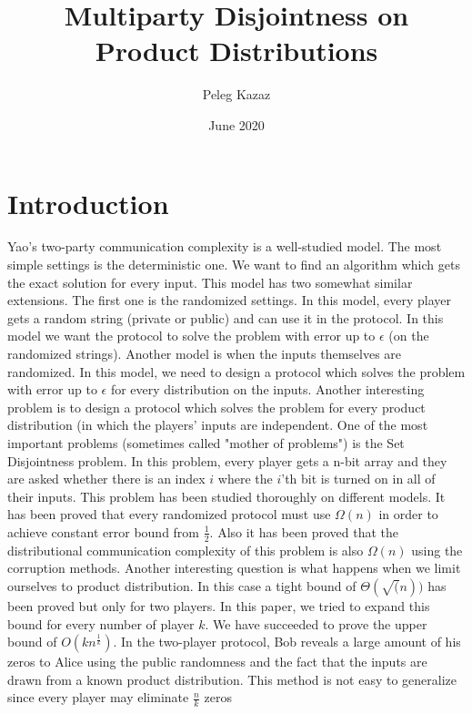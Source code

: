 \documentclass{article}
\title{Multiparty Disjointness on Product Distributions}
\author{Peleg Kazaz}
\date{June 2020}
\theoremstyle{plain}
\begin{document}
\maketitle


\section{Introduction}
Yao's two-party communication complexity is a well-studied model. The most simple settings is the deterministic one. We want to find an algorithm which gets the exact solution for every input. This model has two somewhat similar extensions. The first one is the randomized settings. In this model, every player gets a random string (private or public) and can use it in the protocol. In this model we want the protocol to solve the problem with error up to $\epsilon$ (on the randomized strings). \newline
Another model is when the inputs themselves are randomized. In this model, we need to design a protocol which solves the problem with error up to $\epsilon$ for every distribution on the inputs. Another interesting problem is to design a protocol which solves the problem for every product distribution (in which the players' inputs are independent. \newline
One of the most important problems (sometimes called "mother of problems") is the Set Disjointness problem. In this problem, every player gets a n-bit array and they are asked whether there is an index $i$ where the $i$'th bit is turned on in all of their inputs. \newline
This problem has been studied thoroughly on different models. It has been proved that every randomized protocol must use $\Omega(n)$ in order to achieve constant error bound from $\frac{1}{2}$.  Also it has been proved that the distributional communication complexity of this problem is also $\Omega(n)$ using the corruption methods. Another interesting question is what happens when we limit ourselves to product distribution. In this case a tight bound of $\Theta(\sqrt(n))$ has been proved but only for two players. \newline
In this paper, we tried to expand this bound for every number of player $k$. We have succeeded to prove the upper bound of $O(kn^{\frac{1}{k}})$. 
In the two-player protocol, Bob reveals a large amount of his zeros to Alice using the public randomness and the fact that the inputs are drawn from a known product distribution. This method is not easy to generalize since every player may eliminate $\frac{n}{k}$ zeros 
\end{document}
